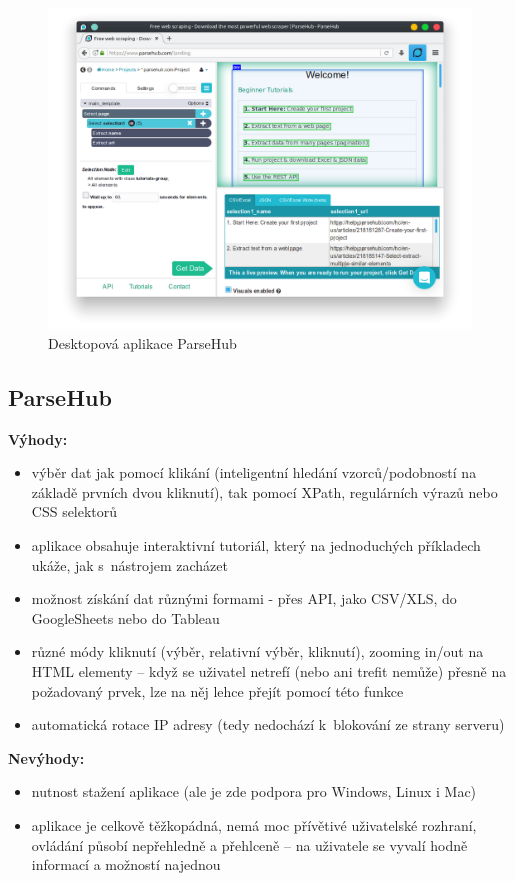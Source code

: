 \documentclass[thesis=B,czech]{FITthesis}[2012/06/26]
\begin{document}
\begin{figure}
	\includegraphics[width=\linewidth]{images/ParseHub.png}
	\caption{Desktopová aplikace ParseHub\cite[snímek pořídil autor]{parsehub}}
	\label{fig:parseHub}
\end{figure}
\subsection{ParseHub}
\textbf{Výhody:}
\begin{itemize}
	\item výběr dat jak pomocí klikání (inteligentní hledání vzorců/podobností na základě prvních dvou kliknutí), tak pomocí XPath, regulárních výrazů nebo CSS selektorů
	\item aplikace obsahuje interaktivní tutoriál, který na jednoduchých příkladech ukáže, jak s~nástrojem zacházet
	\item možnost získání dat různými formami - přes API, jako CSV/XLS, do GoogleSheets nebo do Tableau
	\item různé módy kliknutí (výběr, relativní výběr, kliknutí), zooming in/out na HTML elementy -- když se uživatel netrefí (nebo ani trefit nemůže) přesně na požadovaný prvek, lze na něj lehce přejít pomocí této funkce
	\item automatická rotace IP adresy (tedy nedochází k~blokování ze strany serveru)
\end{itemize}
\textbf{Nevýhody:}
\begin{itemize}
	\item nutnost stažení aplikace (ale je zde podpora pro Windows, Linux i Mac)
	\item aplikace je celkově těžkopádná, nemá moc přívětivé uživatelské rozhraní, ovládání působí nepřehledně a přehlceně -- na uživatele se vyvalí hodně informací a možností najednou
\end{itemize}
\end{document}
